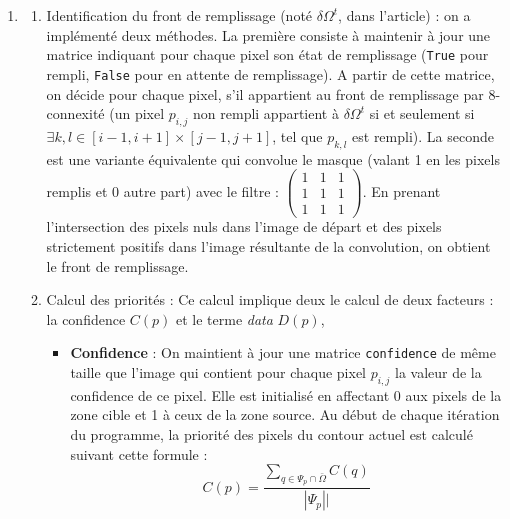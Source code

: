 \documentclass[10pt]{article}
\begin{document}
\begin{enumerate}
\item \begin{enumerate}
\item Identification du front de remplissage (noté $\delta \Omega^t$, dans l'article) : on a implémenté deux méthodes. La première consiste à maintenir à jour une matrice indiquant pour chaque pixel son état de remplissage (\verb+True+ pour rempli, \verb+False+ pour en attente de remplissage). A partir de cette matrice, on décide pour chaque pixel, s'il appartient au front de remplissage par 8-connexité (un pixel $p_{i,j}$ non rempli appartient à $\delta \Omega^t$ si et seulement si $\exists k,l \in [i-1,i+1] \times [j-1,j+1]$, tel que $p_{k,l}$ est rempli). La seconde est une variante équivalente qui convolue le masque (valant 1 en les pixels remplis et 0 autre part) avec le filtre : $\begin{pmatrix} 1 & 1 & 1 \\ 1 & 1 & 1 \\ 1 & 1 & 1  \end{pmatrix}$. En prenant l'intersection des pixels nuls dans l'image de départ et des pixels strictement positifs dans l'image résultante de la convolution, on obtient le front de remplissage.
\item Calcul des priorités : Ce calcul implique deux le calcul de deux facteurs : la confidence $C(p)$ et le terme \textit{data} $D(p)$,

\begin{itemize}
\item \textbf{Confidence} : On maintient à jour une matrice \verb+confidence+ de même taille que l'image qui contient pour chaque pixel $p_{i,j}$ la valeur de la confidence de ce pixel. Elle est initialisé en affectant 0 aux pixels de la zone cible et 1 à ceux de la zone source. Au début de chaque itération du programme, la priorité des pixels du contour actuel est calculé suivant cette formule : 
\begin{equation} C(p) = \frac{\sum_{q\in \Psi_p \cap \bar{\Omega} } C(q) }{|\Psi_p||} 
\label{confidence}
\end{equation} 


\end{itemize}
\end{enumerate}
\end{enumerate}
\end{document}
